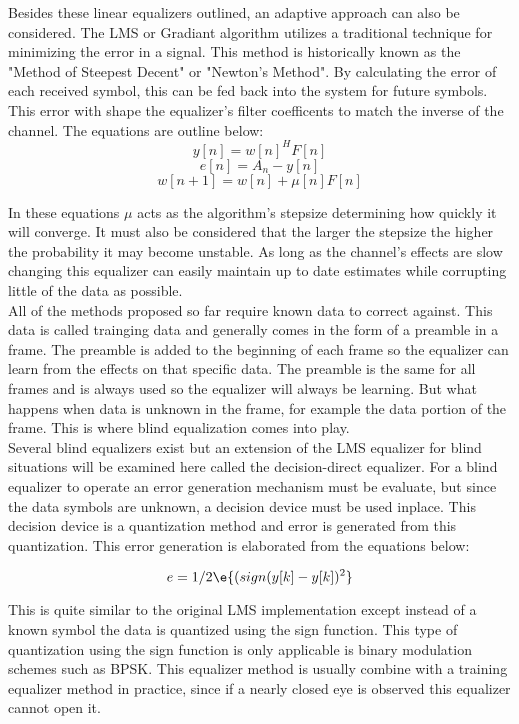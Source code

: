 \documentclass[11pt]{mvlthesis}
\begin{document}
Besides these linear equalizers outlined, an adaptive approach can also be considered.  The LMS or Gradiant algorithm utilizes a traditional technique for minimizing the error in a signal.  This method is historically known as the "Method of Steepest Decent" or "Newton's Method". By calculating the error of each received symbol, this can be fed back into the system for future symbols.  This error with shape the equalizer's filter coefficents to match the inverse of the channel.  The equations are outline below:\\

\[ y[n]=w[n]^{H}F[n]\]
\[ e[n]=A_{n}-y[n]\]
\[ w[n+1]=w[n]+\mu[n]F[n]\] 

In these equations \(\mu\) acts as the algorithm's stepsize determining how quickly it will converge.  It must also be considered that the larger the stepsize the higher the probability it may become unstable.  As long as the channel's effects are slow changing this equalizer can easily maintain up to date estimates while corrupting little of the data as possible.\\  

All of the methods proposed so far require known data to correct against.  This data is called trainging data and generally comes in the form of a preamble in a frame.  The preamble is added to the beginning of each frame so the equalizer can learn from the effects on that specific data.  The preamble is the same for all frames and is always used so the equalizer will always be learning.  But what happens when data is unknown in the frame, for example the data portion of the frame.  This is where blind equalization comes into play.\\

Several blind equalizers exist but an extension of the LMS equalizer for blind situations will be examined here called the decision-direct equalizer.  For a blind equalizer to operate an error generation mechanism must be evaluate, but since the data symbols are unknown, a decision device must be used inplace.  This decision device is a quantization method and error is generated from this quantization.  This error generation is elaborated from the equations below:

\[ e = 1/2\e{(sign(y[k]-y[k])^{2}}\]

This is quite similar to the original LMS implementation except instead of a known symbol the data is quantized using the sign function.  This type of quantization using the sign function is only applicable is binary modulation schemes such as BPSK.  This equalizer method is usually combine with a training equalizer method in practice, since if a nearly closed eye is observed this equalizer cannot open it.\\
\end{document}
